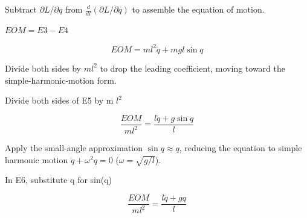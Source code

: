 \documentclass[dvipdfmx]{article}
\begin{document}
Subtract $\partial L/\partial q$ from $\frac{d}{dt}(\partial L/\partial\dot q)$ to assemble the equation of motion.

$EOM = E3 - E4$

\begin{equation}
  EOM = m l^2 \ddot{q}+m g l \sin q
  \label{eq:E5}
\end{equation}

Divide both sides by $ml^2$ to drop the leading coefficient, moving toward the simple-harmonic-motion form.

Divide both sides of E5 by m $l^2$

\begin{equation}
  \frac{EOM}{m l^2} = \frac{l \ddot{q}+g \sin q}{l}
  \label{eq:E6}
\end{equation}

Apply the small-angle approximation $\sin q\approx q$, reducing the equation to simple harmonic motion $\ddot q+\omega^2q=0$ ($\omega=\sqrt{g/l}$).

In E6, substitute q for sin(q)

\begin{equation}
  \frac{EOM}{m l^2} = \frac{l \ddot{q}+g q}{l}
  \label{eq:E7}
\end{equation}
\end{document}
